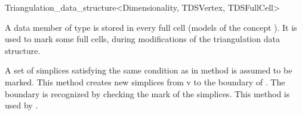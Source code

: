 \begin{ccRefClass}{Triangulation_data_structure<Dimensionality, TDSVertex, TDSFullCell>}
\begin{ccAdvanced}

\ccTypes

{A data member of type  is stored in every full cell (models
of the concept ).  It is used to mark some full
cells, during modifications of the triangulation data structure.}


{A set  of simplices satisfying the same condition as in method
\ccRefName{} is assumed to be marked. This
method creates new simplices from  v to the boundary of .
The boundary is recognized by checking the mark of the simplices.
This method is used by \ccRefName{}.}

\end{ccAdvanced}

\end{ccRefClass}
